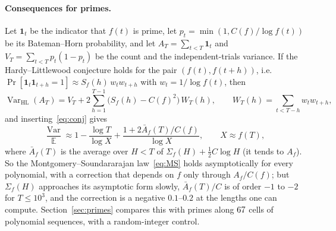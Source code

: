 \documentclass[11pt,a4paper]{article}
\theoremstyle{remark}\newtheorem{remark}[theorem]{Remark}
\newcommand{\Var}{\operatorname{Var}}
\newcommand{\E}{\mathbb{E}}
\begin{document}
\paragraph{Consequences for primes.} Let $\mathbf 1_t$ be the indicator that $f(t)$ is prime, let
$p_t=\min(1,C(f)/\log f(t))$ be its Bateman--Horn probability, and let $A_T=\sum_{t<T}\mathbf 1_t$ and
$V_T=\sum_{t<T}p_t(1-p_t)$ be the count and the independent-trials variance. If the Hardy--Littlewood conjecture holds for
the pair $(f(t),f(t+h))$, i.e.\ $\Pr[\mathbf 1_t\mathbf 1_{t+h}=1]\approx S_f(h)\,w_tw_{t+h}$ with
$w_t=1/\log f(t)$, then
\begin{equation}\label{eq:varHL}
\Var_{\mathrm{HL}}(A_T)=V_T+2\sum_{h=1}^{T-1}\bigl(S_f(h)-C(f)^2\bigr)\,W_T(h),\qquad W_T(h)=\sum_{t<T-h}w_tw_{t+h},
\end{equation}
and inserting~\eqref{eq:conj} gives
\begin{equation}\label{eq:law}
\frac{\Var}{\E}\approx1-\frac{\log T}{\log X}+\frac{1+2\bar A_f(T)/C(f)}{\log X},\qquad X\approx f(T),
\end{equation}
where $\bar A_f(T)$ is the average over $H<T$ of $\Sigma_f(H)+\tfrac12C\log H$ (it tends to $A_f$).
So the Montgomery--Soundararajan law~\eqref{eq:MS} holds asymptotically for every polynomial, with a
correction that depends on $f$ only through $A_f/C(f)$; but $\Sigma_f(H)$ approaches its asymptotic form
slowly, $\bar A_f(T)/C$ is of order $-1$ to $-2$ for $T\le10^3$, and the correction is a negative
$0.1$--$0.2$ at the lengths one can compute. Section~\ref{sec:primes} compares this with primes along
$67$ cells of polynomial sequences, with a random-integer control.
\end{document}

